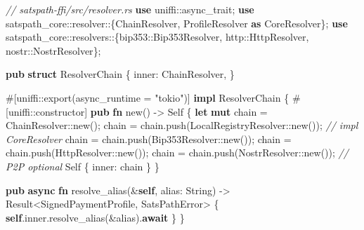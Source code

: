 \documentclass[
]{article}
\newenvironment{Shaded}{}{}
\newcommand{\AttributeTok}[1]{\textcolor[rgb]{0.49,0.56,0.16}{#1}}
\newcommand{\CommentTok}[1]{\textcolor[rgb]{0.38,0.63,0.69}{\textit{#1}}}
\newcommand{\DataTypeTok}[1]{\textcolor[rgb]{0.56,0.13,0.00}{#1}}
\newcommand{\KeywordTok}[1]{\textcolor[rgb]{0.00,0.44,0.13}{\textbf{#1}}}
\newcommand{\NormalTok}[1]{#1}
\newcommand{\OperatorTok}[1]{\textcolor[rgb]{0.40,0.40,0.40}{#1}}
\newcommand{\PreprocessorTok}[1]{\textcolor[rgb]{0.74,0.48,0.00}{#1}}
\newcommand{\StringTok}[1]{\textcolor[rgb]{0.25,0.44,0.63}{#1}}
\begin{document}
\begin{Shaded}
\begin{Highlighting}[]
\CommentTok{// satspath{-}ffi/src/resolver.rs}
\KeywordTok{use} \PreprocessorTok{uniffi::}\NormalTok{async\_trait}\OperatorTok{;}
\KeywordTok{use} \PreprocessorTok{satspath\_core::resolver::}\OperatorTok{\{}\NormalTok{ChainResolver}\OperatorTok{,}\NormalTok{ ProfileResolver }\KeywordTok{as}\NormalTok{ CoreResolver}\OperatorTok{\};}
\KeywordTok{use} \PreprocessorTok{satspath\_core::resolvers::}\OperatorTok{\{}\PreprocessorTok{bip353::}\NormalTok{Bip353Resolver}\OperatorTok{,} \PreprocessorTok{http::}\NormalTok{HttpResolver}\OperatorTok{,} \PreprocessorTok{nostr::}\NormalTok{NostrResolver}\OperatorTok{\};}

\KeywordTok{pub} \KeywordTok{struct}\NormalTok{ ResolverChain }\OperatorTok{\{}
\NormalTok{    inner}\OperatorTok{:}\NormalTok{ ChainResolver}\OperatorTok{,}
\OperatorTok{\}}

\AttributeTok{\#[}\PreprocessorTok{uniffi::}\NormalTok{export}\AttributeTok{(}\NormalTok{async\_runtime }\OperatorTok{=} \StringTok{"tokio"}\AttributeTok{)]}
\KeywordTok{impl}\NormalTok{ ResolverChain }\OperatorTok{\{}
    \AttributeTok{\#[}\PreprocessorTok{uniffi::}\NormalTok{constructor}\AttributeTok{]}
    \KeywordTok{pub} \KeywordTok{fn}\NormalTok{ new() }\OperatorTok{{-}\textgreater{}} \DataTypeTok{Self} \OperatorTok{\{}
        \KeywordTok{let} \KeywordTok{mut}\NormalTok{ chain }\OperatorTok{=} \PreprocessorTok{ChainResolver::}\NormalTok{new()}\OperatorTok{;}
\NormalTok{        chain }\OperatorTok{=}\NormalTok{ chain}\OperatorTok{.}\NormalTok{push(}\PreprocessorTok{LocalRegistryResolver::}\NormalTok{new())}\OperatorTok{;} \CommentTok{// impl CoreResolver}
\NormalTok{        chain }\OperatorTok{=}\NormalTok{ chain}\OperatorTok{.}\NormalTok{push(}\PreprocessorTok{Bip353Resolver::}\NormalTok{new())}\OperatorTok{;}
\NormalTok{        chain }\OperatorTok{=}\NormalTok{ chain}\OperatorTok{.}\NormalTok{push(}\PreprocessorTok{HttpResolver::}\NormalTok{new())}\OperatorTok{;}
\NormalTok{        chain }\OperatorTok{=}\NormalTok{ chain}\OperatorTok{.}\NormalTok{push(}\PreprocessorTok{NostrResolver::}\NormalTok{new())}\OperatorTok{;}
        \CommentTok{// P2P optional}
        \DataTypeTok{Self} \OperatorTok{\{}\NormalTok{ inner}\OperatorTok{:}\NormalTok{ chain }\OperatorTok{\}}
    \OperatorTok{\}}

    \KeywordTok{pub} \KeywordTok{async} \KeywordTok{fn}\NormalTok{ resolve\_alias(}\OperatorTok{\&}\KeywordTok{self}\OperatorTok{,}\NormalTok{ alias}\OperatorTok{:} \DataTypeTok{String}\NormalTok{) }\OperatorTok{{-}\textgreater{}} \DataTypeTok{Result}\OperatorTok{\textless{}}\NormalTok{SignedPaymentProfile}\OperatorTok{,}\NormalTok{ SatsPathError}\OperatorTok{\textgreater{}} \OperatorTok{\{}
        \KeywordTok{self}\OperatorTok{.}\NormalTok{inner}\OperatorTok{.}\NormalTok{resolve\_alias(}\OperatorTok{\&}\NormalTok{alias)}\OperatorTok{.}\KeywordTok{await}
    \OperatorTok{\}}
\OperatorTok{\}}


\end{Highlighting}
\end{Shaded}
\end{document}
